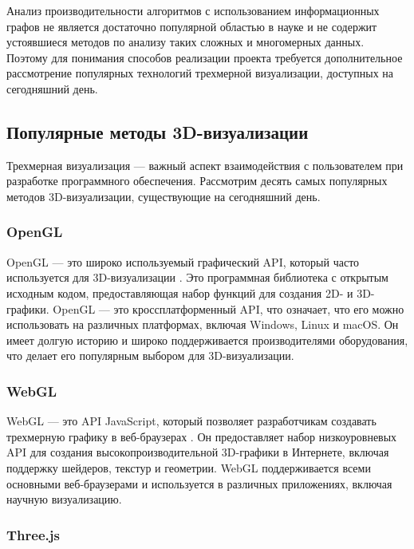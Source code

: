 Анализ производительности алгоритмов с использованием информационных графов не является достаточно популярной областью в науке и не содержит устоявшиеся методов по анализу таких сложных и многомерных данных. Поэтому для понимания способов реализации проекта требуется дополнительное рассмотрение популярных технологий трехмерной визуализации, доступных на сегодняшний день.









\subsection{Популярные методы 3D-визуализации}

Трехмерная визуализация — важный аспект взаимодействия  с пользователем при разработке программного обеспечения. Рассмотрим десять самых популярных методов 3D-визуализации, существующие на сегодняшний день.

\subsubsection{OpenGL}

OpenGL — это широко используемый графический API, который часто используется для 3D-визуализации \cite{OpenGL_offc}. Это программная библиотека с открытым исходным кодом, предоставляющая набор функций для создания 2D- и 3D-графики. OpenGL — это кроссплатформенный API, что означает, что его можно использовать на различных платформах, включая Windows, Linux и macOS. Он имеет долгую историю и широко поддерживается производителями оборудования, что делает его популярным выбором для 3D-визуализации. 

\subsubsection{WebGL}

WebGL — это API JavaScript, который позволяет разработчикам создавать трехмерную графику в веб-браузерах \cite{WebGL_offc}. Он предоставляет набор низкоуровневых API для создания высокопроизводительной 3D-графики в Интернете, включая поддержку шейдеров, текстур и геометрии. WebGL поддерживается всеми основными веб-браузерами и используется в различных приложениях, включая научную визуализацию.  \cite{WebGLGraphicsandAnimation} \cite{ResearchandApplicationofWeb3D}

\subsubsection{Three.js}

